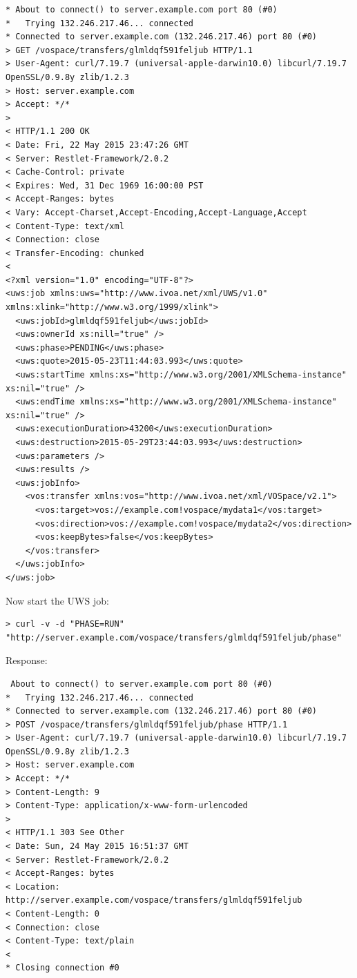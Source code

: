 \documentclass[11pt,a4paper]{ivoa}
\begin{document}
\begin{lstlisting}
* About to connect() to server.example.com port 80 (#0)
*   Trying 132.246.217.46... connected
* Connected to server.example.com (132.246.217.46) port 80 (#0)
> GET /vospace/transfers/glmldqf591feljub HTTP/1.1
> User-Agent: curl/7.19.7 (universal-apple-darwin10.0) libcurl/7.19.7 OpenSSL/0.9.8y zlib/1.2.3
> Host: server.example.com
> Accept: */*
>
< HTTP/1.1 200 OK
< Date: Fri, 22 May 2015 23:47:26 GMT
< Server: Restlet-Framework/2.0.2
< Cache-Control: private
< Expires: Wed, 31 Dec 1969 16:00:00 PST
< Accept-Ranges: bytes
< Vary: Accept-Charset,Accept-Encoding,Accept-Language,Accept
< Content-Type: text/xml
< Connection: close
< Transfer-Encoding: chunked
<
<?xml version="1.0" encoding="UTF-8"?>
<uws:job xmlns:uws="http://www.ivoa.net/xml/UWS/v1.0" xmlns:xlink="http://www.w3.org/1999/xlink">
  <uws:jobId>glmldqf591feljub</uws:jobId>
  <uws:ownerId xs:nill="true" />
  <uws:phase>PENDING</uws:phase>
  <uws:quote>2015-05-23T11:44:03.993</uws:quote>
  <uws:startTime xmlns:xs="http://www.w3.org/2001/XMLSchema-instance" xs:nil="true" />
  <uws:endTime xmlns:xs="http://www.w3.org/2001/XMLSchema-instance" xs:nil="true" />
  <uws:executionDuration>43200</uws:executionDuration>
  <uws:destruction>2015-05-29T23:44:03.993</uws:destruction>
  <uws:parameters />
  <uws:results />
  <uws:jobInfo>
    <vos:transfer xmlns:vos="http://www.ivoa.net/xml/VOSpace/v2.1">
      <vos:target>vos://example.com!vospace/mydata1</vos:target>
      <vos:direction>vos://example.com!vospace/mydata2</vos:direction>
      <vos:keepBytes>false</vos:keepBytes>
    </vos:transfer>
  </uws:jobInfo>
</uws:job>
\end{lstlisting}
Now start the UWS job:
\begin{lstlisting}
> curl -v -d "PHASE=RUN" "http://server.example.com/vospace/transfers/glmldqf591feljub/phase"
\end{lstlisting}
Response:
\begin{lstlisting}
 About to connect() to server.example.com port 80 (#0)
*   Trying 132.246.217.46... connected
* Connected to server.example.com (132.246.217.46) port 80 (#0)
> POST /vospace/transfers/glmldqf591feljub/phase HTTP/1.1
> User-Agent: curl/7.19.7 (universal-apple-darwin10.0) libcurl/7.19.7 OpenSSL/0.9.8y zlib/1.2.3
> Host: server.example.com
> Accept: */*
> Content-Length: 9
> Content-Type: application/x-www-form-urlencoded
>
< HTTP/1.1 303 See Other
< Date: Sun, 24 May 2015 16:51:37 GMT
< Server: Restlet-Framework/2.0.2
< Accept-Ranges: bytes
< Location: http://server.example.com/vospace/transfers/glmldqf591feljub
< Content-Length: 0
< Connection: close
< Content-Type: text/plain
<
* Closing connection #0
\end{lstlisting}
\end{document}
